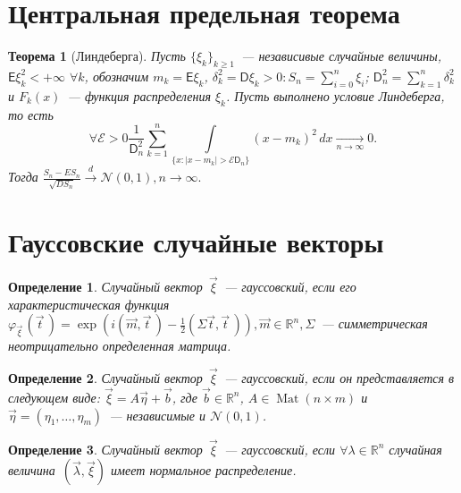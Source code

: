 \documentclass[11pt]{article}
\DeclareMathOperator{\mat}{Mat}
\begin{document}
\newtheorem{definition}{Определение}
\newtheorem{thm}{Теорема}[section]
\newenvironment{problem}[1]{\vspace{3pt} {\sffamily\bfseries\thesum. #1} \par}%
{\vspace{12pt} \\ \stepcounter{sum}}
	\section{Центральная предельная теорема}
	\begin{thm}[Линдеберга]
	Пусть $\{\xi_k\}_{k\geq1}$~--- независивые случайные величины, $\mathsf{E}\xi_k^2<+\infty$ $\forall k$, обозначим $m_k = \mathsf{E}\xi_k$, $\delta_k^2 = \mathsf{D}\xi_k > 0: S_n = \sum\limits_{i = 0}^n \xi_i $; $\mathsf{D}_n^2 = \sum\limits_{k = 1}^n \delta_k^2$ и $F_k(x)$~--- функция распределения $\xi_k$. Пусть выполнено условие Линдеберга, то есть
  	$$\forall\mathcal{E}>0 \frac{1}{\mathsf{D}_n^2} \sum  \limits_{k = 1}^n \int \limits_{\{x:|x-m_k|>\mathcal{E} \mathsf{D}_n\}} (x-m_k)^2 \, dx \xrightarrow[n\rightarrow\infty]{}0.$$ 
  	Тогда $\frac{S_n-ES_n}{\sqrt{DS_n}}\xrightarrow{d} \mathcal{N}(0,1), n\rightarrow\infty.$
	\end{thm}
	\section{Гауссовские случайные векторы}
	\begin{definition}
	Случайный вектор~$\vec{\xi}$~--- гауссовский, если его характеристическая функция
	$\varphi_{\vec{\xi}\,} (\vec{t}\,) = \exp\left( i(\vec{m}, \vec{t}\,) - \frac{1}{2}(\Sigma \vec{t},\vec{t}\,)\right), \vec{m}\in\mathbb{R}^n, \Sigma$~--- симметрическая неотрицательно определенная матрица.
	\end{definition}

	\begin{definition}
	Случайный вектор~$\vec{\xi}$~--- гауссовский, если он представляется в следующем виде: 
	$\vec{\xi} = A\vec{\eta} + \vec{b}$, где $\vec{b} \in \mathbb{R}^n$, $A\in \mat(n\times m)$ и $\vec{\eta} = (\eta_1, \dots , \eta_m)$~--- независимые и $\mathcal{N}(0,1)$.
	\end{definition}
	
	\begin{definition}
	Случайный вектор~$\vec{\xi}$~--- гауссовский, если $\forall\lambda\in\mathbb{R}^n$ случайная величина~$(\vec{\lambda},\vec{\xi})$ имеет нормальное распределение.
	\end{definition}
	
\end{document}
